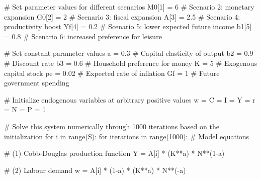 \documentclass[
  letterpaper,
  DIV=11,
  numbers=noendperiod]{scrreprt}
\newenvironment{Shaded}{\begin{snugshade}}{\end{snugshade}}
\newcommand{\BuiltInTok}[1]{\textcolor[rgb]{0.00,0.23,0.31}{#1}}
\newcommand{\CommentTok}[1]{\textcolor[rgb]{0.37,0.37,0.37}{#1}}
\newcommand{\ControlFlowTok}[1]{\textcolor[rgb]{0.00,0.23,0.31}{#1}}
\newcommand{\DecValTok}[1]{\textcolor[rgb]{0.68,0.00,0.00}{#1}}
\newcommand{\FloatTok}[1]{\textcolor[rgb]{0.68,0.00,0.00}{#1}}
\newcommand{\KeywordTok}[1]{\textcolor[rgb]{0.00,0.23,0.31}{#1}}
\newcommand{\NormalTok}[1]{\textcolor[rgb]{0.00,0.23,0.31}{#1}}
\newcommand{\OperatorTok}[1]{\textcolor[rgb]{0.37,0.37,0.37}{#1}}
\begin{document}
\begin{tcolorbox}
\begin{Shaded}
\begin{Highlighting}[]
\CommentTok{\# Set parameter values for different scenarios}
\NormalTok{M0[}\DecValTok{1}\NormalTok{] }\OperatorTok{=} \DecValTok{6}   \CommentTok{\# Scenario 2: monetary expansion}
\NormalTok{G0[}\DecValTok{2}\NormalTok{] }\OperatorTok{=} \DecValTok{2}   \CommentTok{\# Scenario 3: fiscal expansion}
\NormalTok{A[}\DecValTok{3}\NormalTok{] }\OperatorTok{=} \FloatTok{2.5}  \CommentTok{\# Scenario 4: productivity boost}
\NormalTok{Yf[}\DecValTok{4}\NormalTok{] }\OperatorTok{=} \FloatTok{0.2}  \CommentTok{\# Scenario 5: lower expected future income}
\NormalTok{b1[}\DecValTok{5}\NormalTok{] }\OperatorTok{=} \FloatTok{0.8}  \CommentTok{\# Scenario 6: increased preference for leisure}

\CommentTok{\# Set constant parameter values}
\NormalTok{a }\OperatorTok{=} \FloatTok{0.3}  \CommentTok{\# Capital elasticity of output}
\NormalTok{b2 }\OperatorTok{=} \FloatTok{0.9}  \CommentTok{\# Discount rate}
\NormalTok{b3 }\OperatorTok{=} \FloatTok{0.6}  \CommentTok{\# Household preference for money}
\NormalTok{K }\OperatorTok{=} \DecValTok{5}  \CommentTok{\# Exogenous capital stock}
\NormalTok{pe }\OperatorTok{=} \FloatTok{0.02}  \CommentTok{\# Expected rate of inflation}
\NormalTok{Gf }\OperatorTok{=} \DecValTok{1}  \CommentTok{\# Future government spending}

\CommentTok{\# Initialize endogenous variables at arbitrary positive values}
\NormalTok{w }\OperatorTok{=}\NormalTok{ C }\OperatorTok{=}\NormalTok{ I }\OperatorTok{=}\NormalTok{ Y }\OperatorTok{=}\NormalTok{ r }\OperatorTok{=}\NormalTok{ N }\OperatorTok{=}\NormalTok{ P }\OperatorTok{=} \DecValTok{1} 

\CommentTok{\# Solve this system numerically through 1000 iterations based on the initialization}
\ControlFlowTok{for}\NormalTok{ i }\KeywordTok{in} \BuiltInTok{range}\NormalTok{(S):}
    \ControlFlowTok{for}\NormalTok{ iterations }\KeywordTok{in} \BuiltInTok{range}\NormalTok{(}\DecValTok{1000}\NormalTok{):}
        \CommentTok{\# Model equations}

        \CommentTok{\# (1) Cobb{-}Douglas production function}
\NormalTok{        Y }\OperatorTok{=}\NormalTok{ A[i] }\OperatorTok{*}\NormalTok{ (K}\OperatorTok{**}\NormalTok{a) }\OperatorTok{*}\NormalTok{ N}\OperatorTok{**}\NormalTok{(}\DecValTok{1}\OperatorTok{{-}}\NormalTok{a)}

        \CommentTok{\# (2) Labour demand}
\NormalTok{        w }\OperatorTok{=}\NormalTok{ A[i] }\OperatorTok{*}\NormalTok{ (}\DecValTok{1}\OperatorTok{{-}}\NormalTok{a) }\OperatorTok{*}\NormalTok{ (K}\OperatorTok{**}\NormalTok{a) }\OperatorTok{*}\NormalTok{ N}\OperatorTok{**}\NormalTok{(}\OperatorTok{{-}}\NormalTok{a)}


\end{Highlighting}
\end{Shaded}
\end{tcolorbox}
\end{document}
